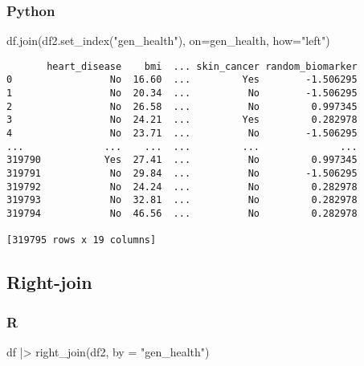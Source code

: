 \documentclass[
  letterpaper,
  DIV=11,
  numbers=noendperiod]{scrreprt}
\newenvironment{Shaded}{\begin{snugshade}}{\end{snugshade}}
\newcommand{\AttributeTok}[1]{\textcolor[rgb]{0.40,0.46,0.14}{#1}}
\newcommand{\FunctionTok}[1]{\textcolor[rgb]{0.28,0.35,0.67}{#1}}
\newcommand{\NormalTok}[1]{\textcolor[rgb]{0.00,0.46,0.62}{#1}}
\newcommand{\OperatorTok}[1]{\textcolor[rgb]{0.37,0.37,0.37}{#1}}
\newcommand{\SpecialCharTok}[1]{\textcolor[rgb]{0.37,0.37,0.37}{#1}}
\newcommand{\StringTok}[1]{\textcolor[rgb]{0.13,0.47,0.30}{#1}}
\begin{document}
\hypertarget{python-34}{%
\subsubsection{Python}\label{python-34}}

\begin{Shaded}
\begin{Highlighting}[]
\NormalTok{df.join(df2.set\_index(}\StringTok{"gen\_health"}\NormalTok{), on}\OperatorTok{=}\StringTok{\textquotesingle{}gen\_health\textquotesingle{}}\NormalTok{, how}\OperatorTok{=}\StringTok{"left"}\NormalTok{)}
\end{Highlighting}
\end{Shaded}

\begin{verbatim}
       heart_disease    bmi  ... skin_cancer random_biomarker
0                 No  16.60  ...         Yes        -1.506295
1                 No  20.34  ...          No        -1.506295
2                 No  26.58  ...          No         0.997345
3                 No  24.21  ...         Yes         0.282978
4                 No  23.71  ...          No        -1.506295
...              ...    ...  ...         ...              ...
319790           Yes  27.41  ...          No         0.997345
319791            No  29.84  ...          No        -1.506295
319792            No  24.24  ...          No         0.282978
319793            No  32.81  ...          No         0.282978
319794            No  46.56  ...          No         0.282978

[319795 rows x 19 columns]
\end{verbatim}

\hypertarget{right-join}{%
\subsection{Right-join}\label{right-join}}

\hypertarget{r-35}{%
\subsubsection{R}\label{r-35}}

\begin{Shaded}
\begin{Highlighting}[]
\NormalTok{df }\SpecialCharTok{|\textgreater{}} \FunctionTok{right\_join}\NormalTok{(df2, }\AttributeTok{by =} \StringTok{"gen\_health"}\NormalTok{)}
\end{Highlighting}
\end{Shaded}
\end{document}
